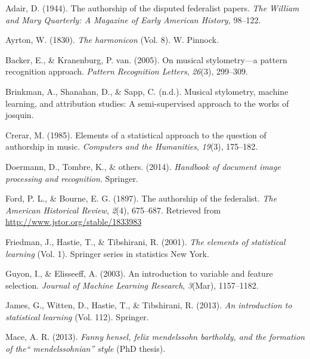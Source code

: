 \documentclass[12pt,twoside]{reedthesis}
\theoremstyle{definition}
\theoremstyle{definition}
\theoremstyle{definition}
\theoremstyle{remark}
\begin{document}

\noindent

\setlength{\parindent}{-0.20in} \setlength{\leftskip}{0.20in}
\setlength{\parskip}{8pt}

\hypertarget{refs}{}
\hypertarget{ref-adair1944}{}
Adair, D. (1944). The authorship of the disputed federalist papers.
\emph{The William and Mary Quarterly: A Magazine of Early American
History,} 98--122.

\hypertarget{ref-harmonicon}{}
Ayrton, W. (1830). \emph{The harmonicon} (Vol. 8). W. Pinnock.

\hypertarget{ref-backer2005}{}
Backer, E., \& Kranenburg, P. van. (2005). On musical stylometry---a
pattern recognition approach. \emph{Pattern Recognition Letters},
\emph{26}(3), 299--309.

\hypertarget{ref-brinkman2016}{}
Brinkman, A., Shanahan, D., \& Sapp, C. (n.d.). Musical stylometry,
machine learning, and attribution studies: A semi-supervised approach to
the works of josquin.

\hypertarget{ref-crerar}{}
Crerar, M. (1985). Elements of a statistical approach to the question of
authorship in music. \emph{Computers and the Humanities}, \emph{19}(3),
175--182.

\hypertarget{ref-OMR}{}
Doermann, D., Tombre, K., \& others. (2014). \emph{Handbook of document
image processing and recognition}. Springer.

\hypertarget{ref-authorshipfed}{}
Ford, P. L., \& Bourne, E. G. (1897). The authorship of the federalist.
\emph{The American Historical Review}, \emph{2}(4), 675--687. Retrieved
from \url{http://www.jstor.org/stable/1833983}

\hypertarget{ref-esl}{}
Friedman, J., Hastie, T., \& Tibshirani, R. (2001). \emph{The elements
of statistical learning} (Vol. 1). Springer series in statistics New
York.

\hypertarget{ref-guyon2003}{}
Guyon, I., \& Elisseeff, A. (2003). An introduction to variable and
feature selection. \emph{Journal of Machine Learning Research},
\emph{3}(Mar), 1157--1182.

\hypertarget{ref-isl}{}
James, G., Witten, D., Hastie, T., \& Tibshirani, R. (2013). \emph{An
introduction to statistical learning} (Vol. 112). Springer.

\hypertarget{ref-mace2013}{}
Mace, A. R. (2013). \emph{Fanny hensel, felix mendelssohn bartholdy, and
the formation of the`` mendelssohnian'' style} (PhD thesis).
\end{document}
